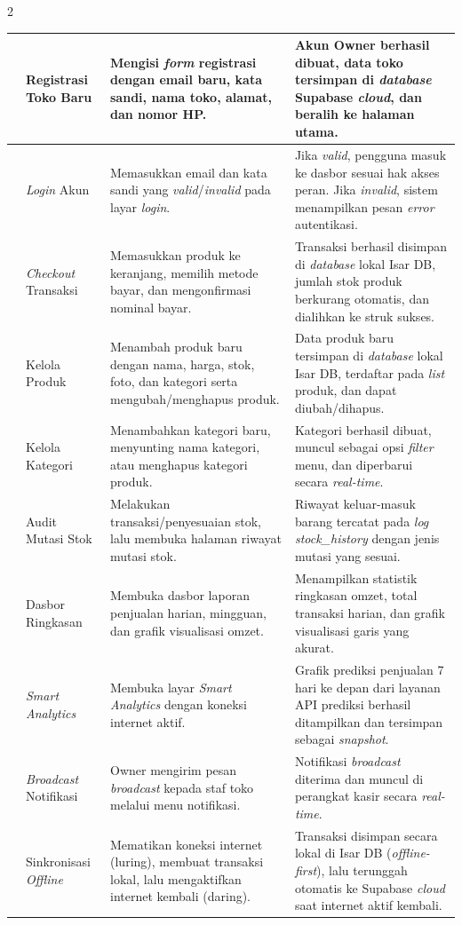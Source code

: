 \documentclass[12pt, a4paper, onecolumn, oneside]{report}
\begin{document}
\begin{spacing}{2}
{\begin{longtable}{|>{\centering\arraybackslash}p{0.6cm}|>{\raggedright\arraybackslash}p{3.0cm}|>{\raggedright\arraybackslash}p{4.7cm}|>{\raggedright\arraybackslash}p{4.7cm}|}
1 & Registrasi Toko Baru & Mengisi \textit{form} registrasi dengan email baru, kata sandi, nama toko, alamat, dan nomor HP. & Akun Owner berhasil dibuat, data toko tersimpan di \textit{database} Supabase \textit{cloud}, dan beralih ke halaman utama. \\
\hline
2 & \textit{Login} Akun & Memasukkan email dan kata sandi yang \textit{valid}/\textit{invalid} pada layar \textit{login}. & Jika \textit{valid}, pengguna masuk ke dasbor sesuai hak akses peran. Jika \textit{invalid}, sistem menampilkan pesan \textit{error} autentikasi. \\
\hline
3 & \textit{Checkout} Transaksi & Memasukkan produk ke keranjang, memilih metode bayar, dan mengonfirmasi nominal bayar. & Transaksi berhasil disimpan di \textit{database} lokal Isar DB, jumlah stok produk berkurang otomatis, dan dialihkan ke struk sukses. \\
\hline
4 & Kelola Produk & Menambah produk baru dengan nama, harga, stok, foto, dan kategori serta mengubah/menghapus produk. & Data produk baru tersimpan di \textit{database} lokal Isar DB, terdaftar pada \textit{list} produk, dan dapat diubah/dihapus. \\
\hline
5 & Kelola Kategori & Menambahkan kategori baru, menyunting nama kategori, atau menghapus kategori produk. & Kategori berhasil dibuat, muncul sebagai opsi \textit{filter} menu, dan diperbarui secara \textit{real-time}. \\
\hline
6 & Audit Mutasi Stok & Melakukan transaksi/penyesuaian stok, lalu membuka halaman riwayat mutasi stok. & Riwayat keluar-masuk barang tercatat pada \textit{log} \textit{stock\_history} dengan jenis mutasi yang sesuai. \\
\hline
7 & Dasbor Ringkasan & Membuka dasbor laporan penjualan harian, mingguan, dan grafik visualisasi omzet. & Menampilkan statistik ringkasan omzet, total transaksi harian, dan grafik visualisasi garis yang akurat. \\
\hline
8 & \textit{Smart Analytics} & Membuka layar \textit{Smart Analytics} dengan koneksi internet aktif. & Grafik prediksi penjualan 7 hari ke depan dari layanan API prediksi berhasil ditampilkan dan tersimpan sebagai \textit{snapshot}. \\
\hline
9 & \textit{Broadcast} Notifikasi & Owner mengirim pesan \textit{broadcast} kepada staf toko melalui menu notifikasi. & Notifikasi \textit{broadcast} diterima dan muncul di perangkat kasir secara \textit{real-time}. \\
\hline
10 & Sinkronisasi \textit{Offline} & Mematikan koneksi internet (luring), membuat transaksi lokal, lalu mengaktifkan internet kembali (daring). & Transaksi disimpan secara lokal di Isar DB (\textit{offline-first}), lalu terunggah otomatis ke Supabase \textit{cloud} saat internet aktif kembali. \\

\end{longtable}}
\end{spacing}
\end{document}
